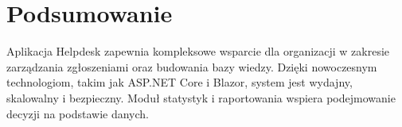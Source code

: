 \documentclass[a4paper,12pt]{article}
\begin{document}
\newpage

\section{Podsumowanie}
Aplikacja Helpdesk zapewnia kompleksowe wsparcie dla organizacji w zakresie zarządzania zgłoszeniami oraz budowania bazy wiedzy. Dzięki nowoczesnym technologiom, takim jak ASP.NET Core i Blazor, system jest wydajny, skalowalny i bezpieczny. Moduł statystyk i raportowania wspiera podejmowanie decyzji na podstawie danych.
\end{document}
